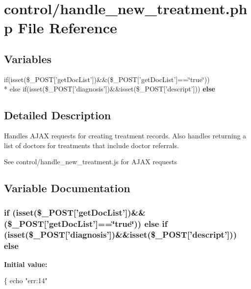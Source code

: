 \hypertarget{handle__new__treatment_8php}{\section{control/handle\-\_\-new\-\_\-treatment.php File Reference}
\label{handle__new__treatment_8php}
}
\subsection*{Variables}
\begin{DoxyCompactItemize}
\item 
if(isset(\$\-\_\-\-P\-O\-S\-T\mbox{[}'get\-Doc\-List'\mbox{]})\&\&(\$\-\_\-\-P\-O\-S\-T\mbox{[}'get\-Doc\-List'\mbox{]}==\char`\"{}true\char`\"{})) \\*
else if(isset(\$\-\_\-\-P\-O\-S\-T\mbox{[}'diagnosis'\mbox{]})\&\&isset(\$\-\_\-\-P\-O\-S\-T\mbox{[}'descript'\mbox{]})) {\bfseries else}
\end{DoxyCompactItemize}


\subsection{Detailed Description}
Handles A\-J\-A\-X requests for creating treatment records. Also handles returning a list of doctors for treatments that include doctor referrals.

See control/handle\-\_\-new\-\_\-treatment.\-js for A\-J\-A\-X requests 

\subsection{Variable Documentation}
\hypertarget{handle__new__treatment_8php_af193675f4a9a0a5b39ba0fdfe4ead91d}{
\subsubsection[{else}]{\setlength{\rightskip}{0pt plus 5cm}if (isset(\$\-\_\-\-P\-O\-S\-T\mbox{[}'get\-Doc\-List'\mbox{]})\&\&(\$\-\_\-\-P\-O\-S\-T\mbox{[}'get\-Doc\-List'\mbox{]}==\char`\"{}true\char`\"{})) else if (isset(\$\-\_\-\-P\-O\-S\-T\mbox{[}'diagnosis'\mbox{]})\&\&isset(\$\-\_\-\-P\-O\-S\-T\mbox{[}'descript'\mbox{]})) else}}\label{handle__new__treatment_8php_af193675f4a9a0a5b39ba0fdfe4ead91d}
{\bfseries Initial value\-:}
\begin{DoxyCode}
\{
    echo \textcolor{stringliteral}{"err:14"}
\end{DoxyCode}
